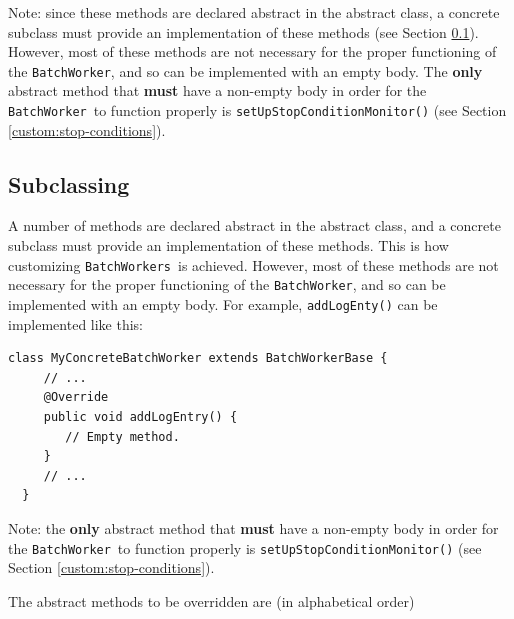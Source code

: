 \documentclass{article}
\newcommand{\BW}{{\tt BatchWorker}}
\newcommand{\BWs}{{\tt BatchWorkers}}
\begin{document}
\begin{sideblock}
Note: since these methods are declared abstract in the abstract  class, a concrete subclass must provide an implementation of these methods (see Section \ref{custom:subclass}). However, most of these methods are not necessary for the proper functioning of the \BW, and so can be implemented with an empty body. The \textbf{only}  abstract method that \textbf{must} have a non-empty body in order for the \BW\ to function properly is {\tt setUpStopConditionMonitor()} (see Section \ref{custom:stop-conditions}).
\end{sideblock}

\subsection{Subclassing }
\label{custom:subclass}

A number of methods are declared abstract in the abstract  class, and a concrete subclass must provide an implementation of these methods. This is how customizing \BWs\ is achieved. However, most of these methods are not necessary for the proper functioning of the \BW, and so can be implemented with an empty body. For example, {\tt addLogEnty()} can be implemented like this:

\begin{lstlisting}[]
  class MyConcreteBatchWorker extends BatchWorkerBase {
     // ...
     @Override
     public void addLogEntry() {
        // Empty method.
     }
     // ...
  }
\end{lstlisting}

\begin{sideblock}
Note: the \textbf{only}  abstract method that \textbf{must} have a non-empty body in order for the \BW\ to function properly is {\tt setUpStopConditionMonitor()} (see Section \ref{custom:stop-conditions}). 
\end{sideblock}

The abstract methods to be overridden are (in alphabetical order)
\end{document}
